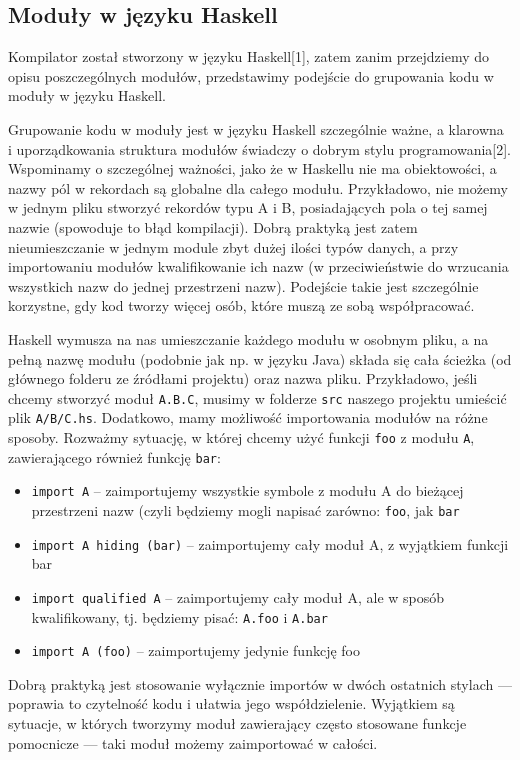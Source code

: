 \subsection{Moduły w języku Haskell}
Kompilator został stworzony w języku Haskell[1], zatem zanim przejdziemy do opisu poszczególnych modułów, przedstawimy podejście do grupowania kodu w moduły w języku Haskell.

Grupowanie kodu w moduły jest w języku Haskell szczególnie ważne, a klarowna i uporządkowania struktura modułów świadczy o dobrym stylu programowania[2]. Wspominamy o szczególnej ważności, jako że w Haskellu nie ma obiektowości, a nazwy pól w rekordach są globalne dla całego modułu. Przykładowo, nie możemy w jednym pliku stworzyć rekordów typu A i B, posiadających pola o tej samej nazwie (spowoduje to błąd kompilacji). Dobrą praktyką jest zatem nieumieszczanie w jednym module zbyt dużej ilości typów danych, a przy importowaniu modułów kwalifikowanie ich nazw (w przeciwieństwie do wrzucania wszystkich nazw do jednej przestrzeni nazw). Podejście takie jest szczególnie korzystne, gdy kod tworzy więcej osób, które muszą ze sobą współpracować.

Haskell wymusza na nas umieszczanie każdego modułu w osobnym pliku, a na pełną nazwę modułu (podobnie jak np. w języku Java) składa się cała ścieżka (od głównego folderu ze źródłami projektu) oraz nazwa pliku. Przykładowo, jeśli chcemy stworzyć moduł \texttt{A.B.C}, musimy w folderze \texttt{src} naszego projektu umieścić plik \texttt{A/B/C.hs}. Dodatkowo, mamy możliwość importowania modułów na różne sposoby. Rozważmy sytuację, w której chcemy użyć funkcji \texttt{foo} z modułu \texttt{A}, zawierającego również funkcję \texttt{bar}:
\begin{itemize}
  \item \texttt{import A} -- zaimportujemy wszystkie symbole z modułu A do bieżącej przestrzeni nazw (czyli będziemy mogli napisać zarówno: \texttt{foo}, jak \texttt{bar}
  \item \texttt{import A hiding (bar)} -- zaimportujemy cały moduł A, z wyjątkiem funkcji bar
  \item \texttt{import qualified A} -- zaimportujemy cały moduł A, ale w sposób kwalifikowany, tj. będziemy pisać: \texttt{A.foo} i \texttt{A.bar}
  \item \texttt{import A (foo)} -- zaimportujemy jedynie funkcję foo
\end{itemize}

Dobrą praktyką jest stosowanie wyłącznie importów w dwóch ostatnich stylach --- poprawia to czytelność kodu i ułatwia jego współdzielenie. Wyjątkiem są sytuacje, w których tworzymy moduł zawierający często stosowane funkcje pomocnicze --- taki moduł możemy zaimportować w całości.

